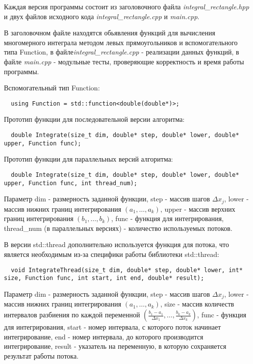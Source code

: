 \documentclass{report}
\begin{document}
\par Каждая версия программы состоит из заголовочного файла \emph{integral\_rectangle.hpp} и двух файлов исходного кода \emph{integral\_rectangle.cpp} и \emph{main.cpp}.
\par В заголовочном файле находятся обьявления функций для вычисления многомерного интеграла методом левых прямоугольников и вспомогательного типа Function, в файле\break \emph{integral\_rectangle.cpp} - реализации данных функций, в файле \emph{main.cpp} - модульные тесты, проверяющие корректность и время работы программы.
\par Вспомогательный тип Function:
\begin{lstlisting}
  using Function = std::function<double(double*)>;
\end{lstlisting}
\par Прототип функции для последовательной версии алгоритма:
\begin{lstlisting}
  double Integrate(size_t dim, double* step, double* lower, double* upper, Function func);
\end{lstlisting}
\par Прототип функции для параллельных версий алгоритма:
\begin{lstlisting}
  double Integrate(size_t dim, double* step, double* lower, double* upper, Function func, int thread_num);
\end{lstlisting}
\par Параметр dim - размерность заданной функции, step - массив шагов \( \Delta x_j \), lower - массив нижних границ интегрирования \( (a_1, \dots, a_k) \), upper - массив верхних границ интегрирования \( (b_1, \dots, b_k) \), func - функция для интегрирования, thread\_num (в параллельных версиях) - количество используемых потоков.
\par В версии std::thread дополнительно используется функция для потока, что является необходимым из-за специфики работы библиотеки std::thread:
\begin{lstlisting}
  void IntegrateThread(size_t dim, double* step, double* lower, int* size, Function func, int start, int end, double* result);
\end{lstlisting}
\par Параметр dim - размерность заданной функции, step - массив шагов \( \Delta x_j \), lower - массив нижних границ интегрирования \( (a_1, \dots, a_k) \), size - массив количеств интервалов разбиения по каждой переменной \( (\frac{b_1 - a_1}{\Delta x_1}, \dots, \frac{b_k - a_k}{\Delta x_k}) \), func - функция для интегрирования, start - номер интервала, с которого поток начинает интегрирование, end - номер интервала, до которого производится интегрирование, result - указатель на переменную, в которую сохраняется результат работы потока.
\end{document}
